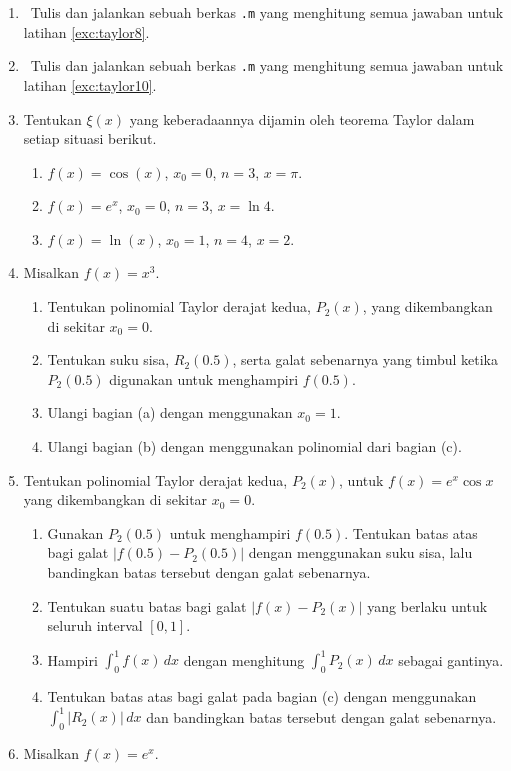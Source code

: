 \begin{enumerate}
\begin{enumerate}
\item 0
\item $\frac{3}{2}$
\item $2$
\item \label{exc:taylor9}$e$ \hasananswer 
\end{enumerate}
\item \octave\ \label{exc:taylor11}Tulis dan jalankan sebuah berkas \texttt{.m}
yang menghitung semua jawaban untuk latihan \ref{exc:taylor8}. \hasasolution 
\item \octave\ Tulis dan jalankan sebuah berkas \texttt{.m} yang menghitung
semua jawaban untuk latihan \ref{exc:taylor10}.
\item Tentukan $\xi(x)$ yang keberadaannya dijamin oleh teorema Taylor
dalam setiap situasi berikut.

\begin{enumerate}
\item \label{exc:taylor7}$f(x)=\cos(x)$, $x_{0}=0$, $n=3$, $x=\pi$. \hasananswer 
\item $f(x)=e^{x}$, $x_{0}=0$, $n=3$, $x=\ln4$.
\item $f(x)=\ln(x)$, $x_{0}=1$, $n=4$, $x=2$.
\end{enumerate}
\item Misalkan $f(x)=x^{3}$.

\begin{enumerate}
\item Tentukan polinomial Taylor derajat kedua, $P_{2}(x)$, yang dikembangkan
di sekitar $x_{0}=0$.
\item Tentukan suku sisa, $R_{2}(0.5)$, serta galat sebenarnya yang timbul
ketika $P_{2}(0.5)$ digunakan untuk menghampiri $f(0.5)$.
\item Ulangi bagian (a) dengan menggunakan $x_{0}=1$.
\item Ulangi bagian (b) dengan menggunakan polinomial dari bagian (c).
\end{enumerate}
\item Tentukan polinomial Taylor derajat kedua, $P_{2}(x)$, untuk $f(x)=e^{x}\cos x$
yang dikembangkan di sekitar $x_{0}=0$.

\begin{enumerate}
\item Gunakan $P_{2}(0.5)$ untuk menghampiri $f(0.5)$. Tentukan batas
atas bagi galat $|f(0.5)-P_{2}(0.5)|$ dengan menggunakan suku sisa,
lalu bandingkan batas tersebut dengan galat sebenarnya.
\item Tentukan suatu batas bagi galat $|f(x)-P_{2}(x)|$ yang berlaku untuk
seluruh interval $[0,1]$.
\item Hampiri $\int_{0}^{1}f(x)\,dx$ dengan menghitung $\int_{0}^{1}P_{2}(x)\,dx$
sebagai gantinya.
\item Tentukan batas atas bagi galat pada bagian (c) dengan menggunakan
$\int_{0}^{1}|R_{2}(x)|\,dx$ dan bandingkan batas tersebut dengan
galat sebenarnya.
\end{enumerate}
\item Misalkan $f(x)=e^{x}$.


\end{enumerate}
